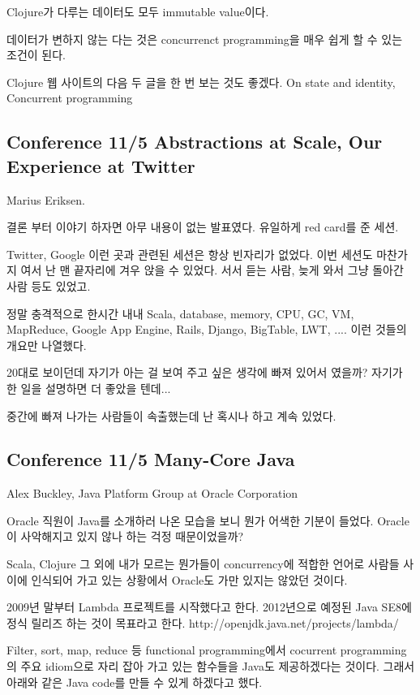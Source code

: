 \documentclass[a4paper]{article}
\begin{document}
Clojure가 다루는 데이터도 모두  immutable value이다. 
 
데이터가 변하지 않는 다는 것은 concurrenct programming을 매우 쉽게 할
수 있는 조건이 된다.
 
Clojure 웹 사이트의 다음 두 글을 한 번 보는 것도 좋겠다.  On state and
identity, Concurrent programming
 
\subsection{Conference 11/5 Abstractions at Scale, Our Experience at Twitter}
 
Marius Eriksen. 
 
결론 부터 이야기 하자면 아무 내용이 없는 발표였다. 유일하게 red card를
준 세션.
 
Twitter, Google 이런 곳과 관련된 세션은 항상 빈자리가 없었다. 이번
세션도 마찬가지 여서 난 맨 끝자리에 겨우 앉을 수 있었다. 서서 듣는
사람, 늦게 와서 그냥 돌아간 사람 등도 있었고.
 
정말 충격적으로 한시간 내내 Scala, database, memory, CPU, GC, VM,
MapReduce, Google App Engine, Rails, Django, BigTable, LWT, .... 이런
것들의 개요만 나열했다.
 
20대로 보이던데 자기가 아는 걸 보여 주고 싶은 생각에 빠져 있어서
였을까? 자기가 한 일을 설명하면 더 좋았을 텐데...
 
중간에 빠져 나가는 사람들이 속출했는데 난 혹시나 하고 계속 있었다. 
 
\subsection{Conference 11/5 Many-Core Java}
 
Alex Buckley, Java Platform Group at Oracle Corporation
 
Oracle 직원이 Java를 소개하러 나온 모습을 보니 뭔가 어색한 기분이
들었다. Oracle이 사악해지고 있지 않나 하는 걱정 때문이었을까?
 
Scala, Clojure 그 외에 내가 모르는 뭔가들이 concurrency에 적합한 언어로
사람들 사이에 인식되어 가고 있는 상황에서 Oracle도 가만 있지는 않았던
것이다.

2009년 말부터 Lambda 프로젝트를 시작했다고 한다. 2012년으로 예정된
Java SE8에 정식 릴리즈 하는 것이 목표라고 한다.
http://openjdk.java.net/projects/lambda/
 
Filter, sort, map, reduce 등 functional programming에서 cocurrent
programming의 주요 idiom으로 자리 잡아 가고 있는 함수들을 Java도
제공하겠다는 것이다. 그래서 아래와 같은 Java code를 만들 수 있게
하겠다고 했다.
 
\end{document}

